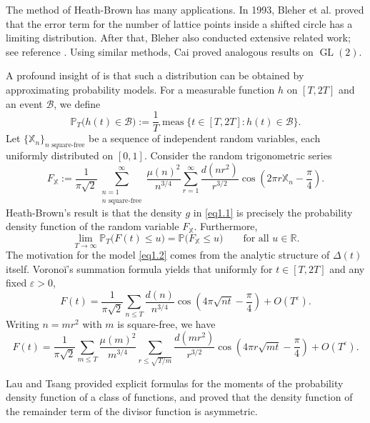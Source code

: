 \documentclass[10pt,leqno]{amsart}
\numberwithin{equation}{section}
\begin{document}
The method of Heath-Brown has many applications. In 1993, Bleher et al. \cite{MR1224087} proved that the error term for the number of lattice points inside a shifted circle has a limiting distribution. After that,  Bleher also conducted extensive related work; see reference \cite{MR1224102,MR1334401}. Using similar methods, Cai \cite{MR1633874} proved analogous results on $\operatorname{GL}(2)$. 

A profound insight of \cite{MR1159354} is that such a distribution can be obtained by approximating probability models. For a measurable function $h$ on $[T, 2T]$ and an event $\mathcal{B}$, we define
\[
\mathbb{P}_T\big(h(t) \in \mathcal{B}\big) := \frac{1}{T} \operatorname{meas}\{ t \in [T, 2T] : h(t) \in \mathcal{B} \}.
\]
Let \(\{\mathbb{X}_n\}_{n \text{ square-free}}\) be a sequence of independent random variables, each uniformly distributed on \([0,1]\). Consider the random trigonometric series
\begin{equation}\label{eq1.2}
F_{\mathbb{X}} := \frac{1}{\pi \sqrt{2}} \sum_{\substack{n=1\\ n \text{ square-free}}}^{\infty} \frac{\mu(n)^2}{n^{3/4}} \sum_{r=1}^{\infty} \frac{d(n r^2)}{r^{3/2}} \cos\left(2\pi r \mathbb{X}_n - \frac{\pi}{4}\right).
\end{equation}
 Heath-Brown's result is that the density $g$ in \eqref{eq1.1} is precisely the probability density function of the random variable $F_{\mathbb{X}}$. Furthermore,
\begin{equation}\label{eq1.3}
\lim_{T \to \infty} \mathbb{P}_T\big(F(t) \le u\big) = \mathbb{P}\big(F_{\mathbb{X}} \le u\big) \qquad \text{for all } u \in \mathbb{R}.
\end{equation}
The motivation for the model \eqref{eq1.2} comes from the analytic structure of $\Delta(t)$ itself. Voronoĭ's summation formula  yields that uniformly for $t \in [T, 2T]$ and any fixed $\varepsilon > 0$,
\[
F(t) = \frac{1}{\pi \sqrt{2}} \sum_{n \le T} \frac{d(n)}{n^{3/4}} \cos\left(4\pi\sqrt{nt} - \frac{\pi}{4}\right) + O(T^{\varepsilon}).
\]
Writing $n = m r^2$ with $m$ is square-free, we have
\[
F(t) = \frac{1}{\pi \sqrt{2}} \sum_{m \le T} \frac{\mu(m)^2}{m^{3/4}} \sum_{r \le \sqrt{T/m}} \frac{d(m r^2)}{r^{3/2}} \cos\left(4\pi r\sqrt{m t} - \frac{\pi}{4}\right) + O(T^{\varepsilon}).
\]

Lau and Tsang \cite{MR2111933}  provided explicit formulas for the moments of the probability density function of a  class of functions, and proved that the density function of the remainder term of the divisor function is asymmetric.
\end{document}
